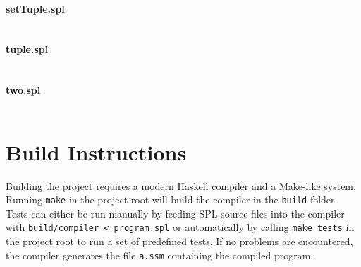 \documentclass[a4paper]{article}
\begin{document}
\paragraph{setTuple.spl}
\begin{verbatim}\end{verbatim}

\paragraph{tuple.spl}
\begin{verbatim}\end{verbatim}

\paragraph{two.spl}
\begin{verbatim}\end{verbatim}


\section{Build Instructions}

Building the project requires a modern Haskell compiler and a Make-like system.
Running \verb|make| in the project root will build the compiler in the \verb|build| folder.
Tests can either be run manually by feeding SPL source files into the compiler with \verb|build/compiler < program.spl| or automatically by calling \verb|make tests| in the project root to run a set of predefined tests.
If no problems are encountered, the compiler generates the file \verb|a.ssm| containing the compiled program.
\end{document}
